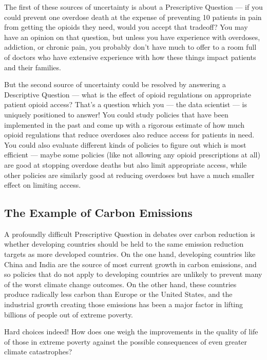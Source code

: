 \documentclass[letterpaper,10pt,english]{jupyterBook}
\begin{document}
\sphinxAtStartPar
The first of these sources of uncertainty is about a Prescriptive Question — if you could prevent one overdose death at the expense of preventing 10 patients in pain from getting the opioids they need, would you accept that trade\sphinxhyphen{}off? You may have an opinion on that question, but unless you have experience with overdoses, addiction, or chronic pain, you probably don’t have much to offer to a room full of doctors who have extensive experience with how these things impact patients and their families.

\sphinxAtStartPar
But the second source of uncertainty could be resolved by answering a Descriptive Question — what is the effect of opioid regulations on appropriate patient opioid access? That’s a question which you — the data scientist — is uniquely positioned to answer! You could study policies that have been implemented in the past and come up with a rigorous estimate of how much opioid regulations that reduce overdoses also reduce access for patients in need. You could also evaluate different kinds of policies to figure out which is most efficient — maybe some policies (like not allowing any opioid prescriptions at all) are good at stopping overdose deaths but also  limit appropriate access, while other policies are similarly good at reducing overdoses but have a much smaller effect on limiting access.


\subsection{The Example of Carbon Emissions}
\label{\detokenize{30_questions/06_descriptive_prescriptive_examples:the-example-of-carbon-emissions}}
\sphinxAtStartPar
A profoundly difficult Prescriptive Question in debates over carbon reduction is whether developing countries should be held to the same emission reduction targets as more developed countries. On the one hand, developing countries like China and India are the source of most current growth in carbon emissions, and so policies that do not apply to developing countries are unlikely to prevent many of the worst climate change outcomes. On the other hand, these countries produce radically less carbon  than Europe or the United States, and the industrial growth creating those emissions has been a major factor in lifting billions of people out of extreme poverty.

\sphinxAtStartPar
Hard choices indeed! How does one weigh the improvements in the quality of life of those in extreme poverty against the possible consequences of even greater climate catastrophes?
\end{document}
